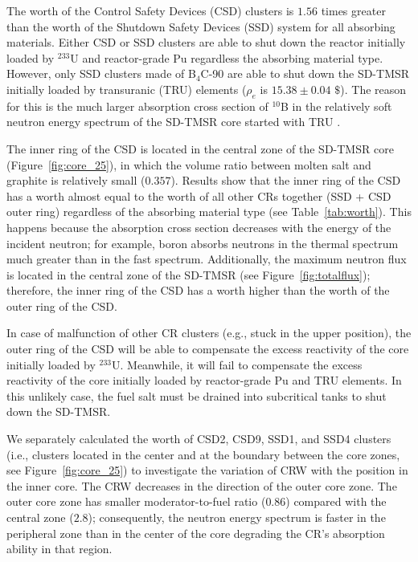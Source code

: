 The worth of the Control Safety Devices (CSD) clusters is $1.56$ times greater than 
the worth of the Shutdown Safety Devices (SSD) system for all absorbing materials. Either CSD or SSD 
clusters are able to shut down the reactor initially loaded by 
$^{233}$U and reactor-grade Pu regardless the absorbing material type.
However, only SSD clusters made of B$_4$C-90 are able to shut down the SD-TMSR 
initially loaded by transuranic (TRU) elements ($\rho_e$ is $15.38\pm0.04$ $\$$).
The reason for this is the much larger 
absorption cross section of $^{10}$B in the relatively soft neutron energy 
spectrum of the SD-TMSR core started with TRU \cite{ashraf2020Strategies}.

The inner ring of the CSD is located in the central zone of the SD-TMSR core 
(Figure~\ref{fig:core_25}), in which the volume ratio between molten salt and 
graphite is relatively small ($0.357$). Results show that the inner ring of the CSD has 
a worth almost equal to the worth of all other CRs together (SSD + CSD outer ring) regardless of 
the absorbing material type (see Table~\ref{tab:worth}). This happens because the absorption cross section
decreases with the energy of the incident neutron; for example, boron absorbs neutrons in the thermal spectrum much 
greater than in the fast spectrum. Additionally, the maximum neutron flux is located in the central zone of the SD-TMSR (see Figure~\ref{fig:totalflux}); therefore, the inner ring of the CSD has a worth higher than the worth of the outer ring of the CSD.

In case of malfunction of other CR clusters (e.g., stuck in the upper 
position), the outer ring of the CSD will be able to compensate the excess reactivity of the core initially loaded by $^{233}$U.
Meanwhile, it will fail to compensate the excess 
reactivity of the core initially loaded by reactor-grade Pu and TRU elements. In this unlikely case, the fuel salt must be drained into subcritical tanks to shut down the SD-TMSR.

We separately calculated the worth of CSD2, CSD9, SSD1, and SSD4 clusters (i.e., clusters located in the center and at the boundary between the core
zones, see Figure~\ref{fig:core_25}) to investigate the variation of CRW with the position in the inner core.
The CRW decreases in the direction of the outer core zone. The outer core zone 
has smaller moderator-to-fuel ratio ($0.86$) compared with the central zone 
($2.8$); consequently, the neutron energy spectrum is faster in the peripheral 
zone than in the center of the core degrading the CR's 
absorption ability in that region.

